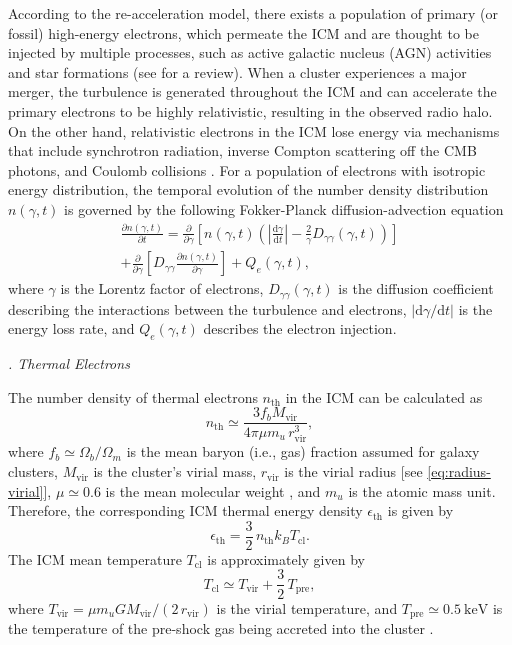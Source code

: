 \documentclass[twocolumn]{aastex62}
\newcommand{\R}[1]{\mathrm{#1}}
\newcommand{\D}[1]{\R{d} #1}
\newcommand{\diff}[2]{\frac{\D{#1}}{\D{#2}}}
\newcommand{\pdiff}[2]{\frac{\partial #1}{\partial #2}}
\newcommand{\editone}[1]{{\leavevmode\color{cyan}#1}}
\newcounter{sssseccount}
\newcommand{\sssseclabel}{\alph{sssseccount}}
\newcommand{\ssssec}[1]{%
  \vspace{1ex}%
  \stepcounter{sssseccount}%
  \noindent\emph{\sssseclabel. #1}%
}
\begin{document}
According to the re-acceleration model, there exists a population of
primary (or fossil) high-energy electrons, which permeate the ICM and
are thought to be injected by multiple processes, such as active
galactic nucleus (AGN) activities and star formations
(see \citealt{blasi2007rev} for a review).
When a cluster experiences a major merger, the turbulence is generated
throughout the ICM and can accelerate the primary electrons to be highly
relativistic, resulting in the observed radio halo.
On the other hand, relativistic electrons in the ICM lose energy via
mechanisms that include synchrotron radiation, inverse Compton scattering
off the CMB photons, and Coulomb collisions \citep{sarazin1999}.
For a population of electrons with isotropic energy distribution, the
temporal evolution of the number density distribution $n(\gamma, t)$
is governed by the following Fokker-Planck diffusion-advection equation
\citep{eilek1991,schlickeiser2002}
\begin{multline}
  \label{eq:fokkerplanck}
  \pdiff{n(\gamma,t)}{t} = \pdiff{}{\gamma} \left[ n(\gamma,t) \left(
      \left| \diff{\gamma}{t} \right| -
      \frac{2}{\gamma} D_{\gamma\gamma}(\gamma, t) \right) \right] \\
    + \pdiff{}{\gamma} \left[ D_{\gamma\gamma} \pdiff{n(\gamma,t)}{\gamma}
    \right] + Q_e(\gamma,t),
\end{multline}
where $\gamma$ is the Lorentz factor of electrons,
$D_{\gamma\gamma}(\gamma, t)$ is the diffusion coefficient describing
the interactions between the turbulence and electrons,
$|\R{d}\gamma / \R{d}t|$ is the energy loss rate,
and $Q_e(\gamma, t)$ describes the electron injection.

\setcounter{sssseccount}{0}
\ssssec{Thermal Electrons}

The number density of thermal electrons $n_{\R{th}}$ in the ICM can be
calculated as
\begin{equation}
  \label{eq:n-th}
  n_{\R{th}} \simeq \frac{3 f_b M_{\R{vir}}}{4\pi \mu m_u \,r^3_{\R{vir}}},
\end{equation}
where
$f_b \simeq \Omega_b/\Omega_m$ is the mean baryon (i.e., gas) fraction
assumed for galaxy clusters,
$M_{\R{vir}}$ is the cluster's virial mass,
$r_{\R{vir}}$ is the virial radius [see \autoref{eq:radius-virial}],
$\mu \simeq 0.6$ is the mean molecular weight \citep[e.g.,][]{ettori2013},
and $m_u$ is the atomic mass unit.
Therefore, the corresponding ICM thermal energy density $\epsilon_{\R{th}}$
is given by
\begin{equation}
  \label{eq:e-th}
  \epsilon_{\R{th}} = \frac{3}{2} \,n_{\R{th}} k_B T_{\R{cl}}.
\end{equation}
\editone{%
The ICM mean temperature $T_{\R{cl}}$ is approximately given by
\citep{cavaliere1998,fujita2003}
\begin{equation}
  \label{eq:t-icm}
  T_{\R{cl}} \simeq T_{\R{vir}} + \frac{3}{2} \,T_{\R{pre}} ,
\end{equation}
where
$T_{\R{vir}} = \mu m_u G M_{\R{vir}} / (2 \,r_{\R{vir}})$ is the virial
temperature, and $T_{\R{pre}} \simeq \SI{0.5}{\keV}$ is the temperature of
the pre-shock gas being accreted into the cluster
\citep{fujita2003}.
} %
\end{document}
